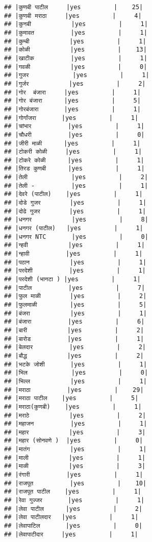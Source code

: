 \documentclass[
]{article}
\begin{document}
\begin{verbatim}
## |कुणबी पाटील     |yes         |    25|
## |कुणबी मराठा     |yes         |     4|
## |कुनबी           |yes         |     1|
## |कुमावत          |yes         |     1|
## |कुम्बी           |yes         |     1|
## |कोळी           |yes         |    13|
## |खाटीक          |yes         |     1|
## |गवळी           |yes         |     0|
## |गुजर            |yes         |     1|
## |गुर्जर           |yes         |     2|
## |गोर  बंजारा     |yes         |     1|
## |गोर बंजारा      |yes         |     5|
## |गोरबंजारा       |yes         |     1|
## |गोर्गांजरा       |yes         |     1|
## |चांभार          |yes         |     1|
## |चौधरी          |yes         |     0|
## |जीरी माळी      |yes         |     1|
## |टोकरी कोळी     |yes         |     1|
## |टोकरे कोळी      |yes         |     1|
## |तिरड कुणबी      |yes         |     1|
## |तेली            |yes         |     2|
## |तेली -          |yes         |     1|
## |देवरे (पाटील)    |yes         |     1|
## |दोडे गुजर        |yes         |     1|
## |दोढे गुजर        |yes         |     1|
## |धनगर           |yes         |     8|
## |धनगर (पाटील)   |yes         |     1|
## |धनगर NTC       |yes         |     0|
## |न्हवी           |yes         |     1|
## |न्हावी          |yes         |     1|
## |पठान           |yes         |     1|
## |परदेशी          |yes         |     1|
## |परदेशी (भानटा ) |yes         |     1|
## |पाटील          |yes         |     7|
## |फुल माळी        |yes         |     2|
## |फुलमाळी         |yes         |     5|
## |बंजरा           |yes         |     1|
## |बंजारा          |yes         |     6|
## |बारी           |yes         |     2|
## |बारोड          |yes         |     1|
## |बेलदार          |yes         |     2|
## |बौद्ध           |yes         |     2|
## |भटके जोशी       |yes         |     1|
## |भिल            |yes         |     0|
## |भिल्ल           |yes         |     1|
## |मराठा          |yes         |    29|
## |मराठा पाटील    |yes         |     5|
## |मराठा(कुणबी)    |yes         |     1|
## |मराठे           |yes         |     2|
## |महाजन          |yes         |     1|
## |महार           |yes         |     3|
## |महार (सोनवणे )  |yes         |     0|
## |मातंग           |yes         |     1|
## |माली           |yes         |     1|
## |माळी           |yes         |     3|
## |रंगारी          |yes         |     1|
## |राजपूत          |yes         |    10|
## |राजपूत पाटील    |yes         |     1|
## |रेवा गुज्जर       |yes         |     1|
## |लेवा पाटील      |yes         |     2|
## |लेवा पाटीलदार   |yes         |     1|
## |लेवापाटिल       |yes         |     0|
## |लेवापाटीदार     |yes         |     1|

\end{verbatim}
\end{document}
